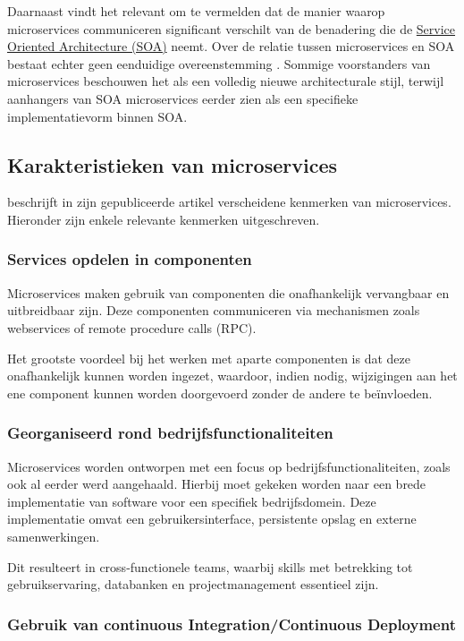 Daarnaast vindt \textcite{Blinowski2022} het relevant om te vermelden dat de manier waarop microservices communiceren significant verschilt van de benadering die de \hyperref[sec:SOA_architectuur]{Service Oriented Architecture (SOA)} neemt. Over de relatie tussen microservices en SOA bestaat echter geen eenduidige overeenstemming \autocite{Li2021}. Sommige voorstanders van microservices beschouwen het als een volledig nieuwe architecturale stijl, terwijl aanhangers van SOA microservices eerder zien als een specifieke implementatievorm binnen SOA.

\subsection{Karakteristieken van microservices}

\textcite{Bakshi2017} beschrijft in zijn gepubliceerde artikel verscheidene kenmerken van microservices. Hieronder zijn enkele relevante kenmerken uitgeschreven.

\subsubsection{Services opdelen in componenten}

Microservices maken gebruik van componenten die onafhankelijk vervangbaar en uitbreidbaar zijn. Deze componenten communiceren via mechanismen zoals webservices of remote procedure calls (RPC).

Het grootste voordeel bij het werken met aparte componenten is dat deze onafhankelijk kunnen worden ingezet, waardoor, indien nodig, wijzigingen aan het ene component kunnen worden doorgevoerd zonder de andere te beïnvloeden.

\subsubsection{Georganiseerd rond bedrijfsfunctionaliteiten}

Microservices worden ontworpen met een focus op bedrijfsfunctionaliteiten, zoals ook al eerder werd aangehaald. Hierbij moet gekeken worden naar een brede implementatie van software voor een specifiek bedrijfsdomein. Deze implementatie omvat een gebruikersinterface, persistente opslag en externe samenwerkingen.

Dit resulteert in cross-functionele teams, waarbij skills met betrekking tot gebruikservaring, databanken en projectmanagement essentieel zijn.

\subsubsection{Gebruik van continuous Integration/Continuous Deployment}

